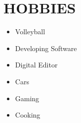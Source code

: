 \documentclass[paper=a4,fontsize=11pt]{scrartcl} %
\newcommand{\NewPart}[1]{\section*{\uppercase{#1}}}
\begin{document}

    \NewPart{Hobbies}{}

    \begin{itemize}
        \item[] Volleyball
        \item[] Developing Software
        \item[] Digital Editor
        \item[] Cars
        \item[] Gaming
        \item[] Cooking
    \end{itemize}
\end{document}
